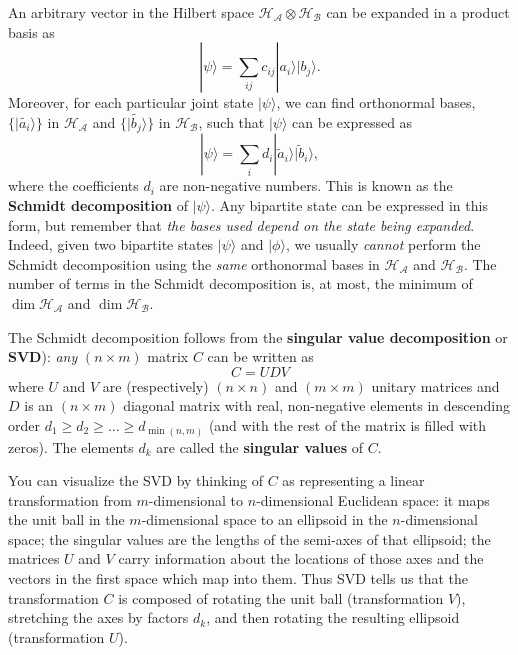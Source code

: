 \documentclass[fleqn]{article}
\begin{document}
An arbitrary vector in the Hilbert space \(\mathcal{H}_{\mathcal{A}}\otimes \mathcal{H}_{\mathcal{B}}\) can be expanded in a product basis as
\[
  |\psi\rangle
  = \sum_{ij} c_{ij}|a_i\rangle|b_j\rangle.
\]
Moreover, for each particular joint state \(|\psi\rangle\), we can find orthonormal bases, \(\{|\widetilde{a_i}\rangle\}\) in \(\mathcal{H}_{\mathcal{A}}\) and \(\{|\widetilde{b_j}\rangle\}\) in \(\mathcal{H}_{\mathcal{B}}\), such that \(|\psi\rangle\) can be expressed as
\[
  |\psi\rangle
  = \sum_{i} d_{i}|\tilde a_i\rangle|\tilde b_i\rangle,
\]
where the coefficients \(d_i\) are non-negative numbers.
This is known as the \textbf{Schmidt decomposition} of \(|\psi\rangle\).
Any bipartite state can be expressed in this form, but remember that \emph{the bases used depend on the state being expanded}.
Indeed, given two bipartite states \(|\psi\rangle\) and \(|\phi\rangle\), we usually \emph{cannot} perform the Schmidt decomposition using the \emph{same} orthonormal bases in \(\mathcal{H}_{\mathcal{A}}\) and \(\mathcal{H}_{\mathcal{B}}\).
The number of terms in the Schmidt decomposition is, at most, the minimum of \(\dim\mathcal{H}_{\mathcal{A}}\) and \(\dim\mathcal{H}_{\mathcal{B}}\).

The Schmidt decomposition follows from the \textbf{singular value decomposition} or \textbf{SVD}): \emph{any} \((n\times m)\) matrix \(C\) can be written as
\[
  C = UDV
\]
where \(U\) and \(V\) are (respectively) \((n\times n)\) and \((m\times m)\) unitary matrices and \(D\) is an \((n\times m)\) diagonal matrix with real, non-negative elements in descending order \(d_1\geqslant d_2\geqslant\ldots\geqslant d_{\min{(n,m)}}\) (and with the rest of the matrix is filled with zeros).
The elements \(d_k\) are called the \textbf{singular values} of \(C\).

You can visualize the SVD by thinking of \(C\) as representing a linear
transformation from \(m\)-dimensional to \(n\)-dimensional Euclidean space: it maps the unit ball in the \(m\)-dimensional space to an ellipsoid in
the \(n\)-dimensional space; the singular values are the lengths of
the semi-axes of that ellipsoid; the matrices \(U\) and \(V\) carry
information about the locations of those axes and the vectors in
the first space which map into them.
Thus SVD tells us that the transformation \(C\) is composed of rotating the unit ball (transformation \(V\)), stretching the axes by factors \(d_k\), and then rotating the resulting ellipsoid (transformation \(U\)).
\end{document}
